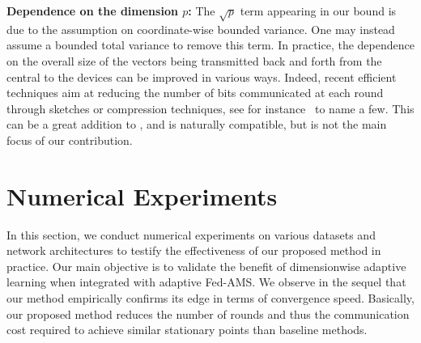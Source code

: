 \documentclass[11pt]{article}
\begin{document}
\textbf{Dependence on the dimension $p$:} The $\sqrt p$ term appearing in our bound is due to the assumption on coordinate-wise bounded variance. One may instead assume a bounded total variance to remove this term. 
In practice, the dependence on the overall size of the vectors being transmitted back and forth from the central to the devices can be improved in various ways. Indeed, recent efficient techniques aim at reducing the number of bits communicated at each round through sketches or compression techniques, see for instance~\citep{haddadpour2020fedsketch,ivkin2019communication,li2019privacy} to name a few.
This can be a great addition to \algo, and is naturally compatible, but is not the main focus of our contribution.





\section{Numerical Experiments}\label{sec:numerical}

In this section, we conduct numerical experiments on various datasets and network architectures to testify the effectiveness of our proposed method in practice. Our main objective is to validate the benefit of dimensionwise adaptive learning when integrated with adaptive Fed-AMS.
We observe in the sequel that our method empirically confirms its edge in terms of convergence speed.
Basically, our proposed method reduces the number of rounds and thus the communication cost required to achieve similar stationary points than baseline methods. 
\end{document}

